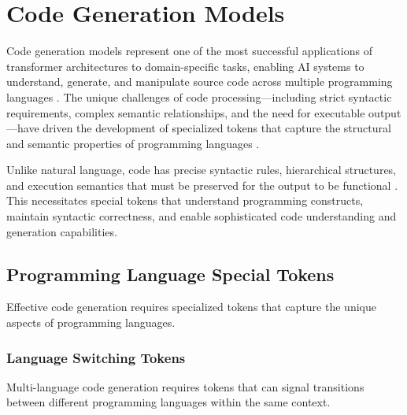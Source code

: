 
\section{Code Generation Models}

Code generation models represent one of the most successful applications of transformer architectures to domain-specific tasks, enabling AI systems to understand, generate, and manipulate source code across multiple programming languages \citep{chen2021evaluating, nijkamp2022codegen}. The unique challenges of code processing—including strict syntactic requirements, complex semantic relationships, and the need for executable output—have driven the development of specialized tokens that capture the structural and semantic properties of programming languages \citep{li2022competition, wang2023codet5}.
\begin{comment}
Feedback: This is a strong introduction. To make the core challenge more vivid, you could add: "Unlike natural language, which is often ambiguous and flexible, code is a formal language where a single misplaced character can render the entire sequence invalid. This unforgiving nature requires special tokens that can explicitly represent the rigid syntax and deep, non-local dependencies inherent in programming."
\end{comment}

Unlike natural language, code has precise syntactic rules, hierarchical structures, and execution semantics that must be preserved for the output to be functional \citep{roziere2023code}. This necessitates special tokens that understand programming constructs, maintain syntactic correctness, and enable sophisticated code understanding and generation capabilities.

\subsection{Programming Language Special Tokens}

Effective code generation requires specialized tokens that capture the unique aspects of programming languages.

\subsubsection{Language Switching Tokens}

Multi-language code generation requires tokens that can signal transitions between different programming languages within the same context.

